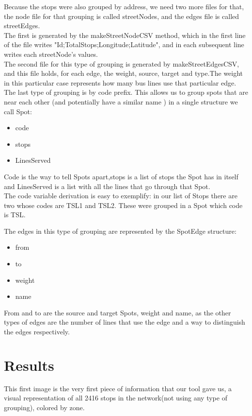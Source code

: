 \documentclass[12pt]{article}
\begin{document}
\begin{multicols}{2}
    Because the stops were also grouped by address, we need two more files for that, the node file for that grouping is called streetNodes, and the edges file is called streetEdges.\\
    The first is generated by the makeStreetNodeCSV method, which in the first line of the file writes "Id;TotalStops;Longitude;Latitude", and in each subsequent line writes each streetNode's values. \\
	The second file for this type of grouping  is generated by makeStreetEdgesCSV, and this file holds, for each edge, the weight, source, target and type.The weight in this particular case represents how many bus lines use that particular edge.\\
	The last type of grouping is by code prefix. This allows us to group spots that are near each other (and potentially have a similar name ) in a single structure we call Spot:
\begin{itemize}
	\item code
	\item stops
	\item LinesServed
\end{itemize}
	
Code is the way to tell Spots apart,stops is a list of stops the Spot has in itself and LinesServed is a list with all the lines that go through that Spot.\\
The code variable derivation is easy to exemplify: in our list of Stops there are two whose codes are TSL1 and TSL2. These were grouped in a Spot which code is TSL.

The edges in this type of grouping are represented by the SpotEdge structure:
\begin{itemize}
\item from
\item to
\item weight
\item name
\end{itemize}

From and to are the source and target Spots, weight and name, as the other types of edges are the number of lines that use the edge and a way to distinguish the edges respectively.
	
\section{Results}
	This first image is the very first piece of information that our tool gave us, a visual representation of all 2416 stops in the network(not using any type of grouping), colored by zone.\\


\end{multicols}
\end{document}
